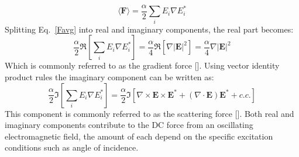 \begin{equation}
\langle \mathbf{F}\rangle = \frac{\alpha }{2}\sum_i E_i\nabla E_i^*
\label{Favg}
\end{equation}
Splitting Eq.~\ref{Favg} into real and imaginary components, the real part becomes:
\begin{equation}
\frac{\alpha}{2}\Re[\sum_i E_i\nabla E_i^*] = \frac{\alpha}{4}\Re[\nabla |\mathbf{E}|^2] = \frac{\alpha}{4}\nabla |\mathbf{E}|^2
\end{equation}
Which is commonly referred to as the gradient force [\cite{Ashkin:86, Proscia}]. Using vector identity product rules the imaginary component can be written as:
\begin{equation}
\frac{\alpha}{2}\Im[\sum_i E_i\nabla E_i^*] = \frac{\alpha}{2}\Im[\nabla\times\mathbf{E}\times\mathbf{E}^* + (\nabla\cdot\mathbf{E})\mathbf{E}^* + c.c.]
\end{equation}
This component is commonly referred to as the scattering force [\cite{KurosawaSPDE, Proscia}]. Both real and imaginary components contribute to the DC force from an oscillating electromagnetic field, the amount of each depend on the specific excitation conditions such as angle of incidence.
%
%

